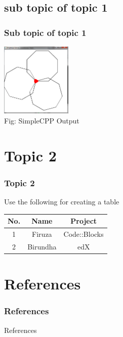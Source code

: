 \documentclass[12pt,xcolor=dvipsnames]{beamer}
\begin{document}
\subsection{sub topic of topic 1}
\begin{frame}[t]
\frametitle{Sub topic of topic 1}

\begin{center}
\includegraphics[height=3.5cm]{simple19.png}\\ %
Fig: SimpleCPP Output \cite{SimpleCPP-Windows}
\end{center}
\end{frame}

\section{Topic 2}
\begin{frame}[t]
\frametitle{Topic 2}
Use the following for creating a table \\
\begin{center}
\begin{tabular}{|c|c|c|}
 \hline
 No. & Name & Project \\
 \hline
 1 & Firuza & Code::Blocks \\
 \hline
 2 & Birundha & edX \\
 \hline
\end{tabular}
\end{center}
\end{frame}


\section{References}
\frametitle{References}
\begin{frame}[allowframebreaks]{References}


\end{frame}
\end{document}
